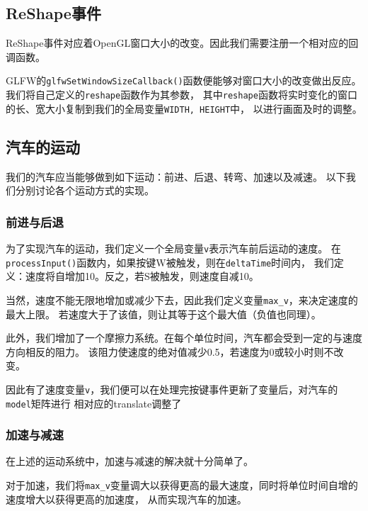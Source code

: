 \documentclass[UTF8]{ctexart}
\begin{document}
\subsection{ReShape事件}
\par
ReShape事件对应着OpenGL窗口大小的改变。因此我们需要注册一个相对应的回调函数。

\par
GLFW的\verb|glfwSetWindowSizeCallback()|函数便能够对窗口大小的改变做出反应。
我们将自己定义的\verb|reshape|函数作为其参数，
其中\verb|reshape|函数将实时变化的窗口的长、宽大小复制到我们的全局变量\verb|WIDTH, HEIGHT|中，
以进行画面及时的调整。

\subsection{汽车的运动}
\par
我们的汽车应当能够做到如下运动：前进、后退、转弯、加速以及减速。
以下我们分别讨论各个运动方式的实现。

\subsubsection{前进与后退}
\par
为了实现汽车的运动，我们定义一个全局变量\verb|v|表示汽车前后运动的速度。
在\verb|processInput()|函数内，如果按键W被触发，则在\verb|deltaTime|时间内，
我们定义：速度将自增加10。反之，若S被触发，则速度自减10。

\par
当然，速度不能无限地增加或减少下去，因此我们定义变量\verb|max_v|，来决定速度的最大上限。
若速度大于了该值，则让其等于这个最大值（负值也同理）。

\par 
此外，我们增加了一个摩擦力系统。在每个单位时间，汽车都会受到一定的与速度方向相反的阻力。
该阻力使速度的绝对值减少0.5，若速度为0或较小时则不改变。

\par
因此有了速度变量\verb|v|，我们便可以在处理完按键事件更新了变量后，对汽车的\verb|model|矩阵进行
相对应的translate调整了


\subsubsection{加速与减速}
\par
在上述的运动系统中，加速与减速的解决就十分简单了。

\par
对于加速，我们将\verb|max_v|变量调大以获得更高的最大速度，同时将单位时间自增的速度增大以获得更高的加速度，
从而实现汽车的加速。
\end{document}
